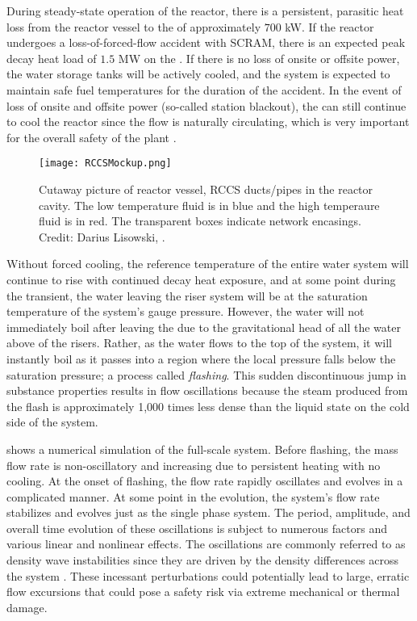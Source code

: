 During steady-state operation of the reactor, there is a persistent, parasitic heat loss from the reactor vessel to the  of approximately $700$ kW.
If the reactor undergoes a loss-of-forced-flow accident with SCRAM, there is an expected peak decay heat load of $1.5$ MW on the .
If there is no loss of onsite or offsite power, the  water storage tanks will be actively cooled, and the system is expected to maintain safe fuel temperatures for the duration of the accident.
In the event of loss of onsite and offsite power (so-called station blackout), the  can still continue to cool the reactor since the flow is naturally circulating, which is very important for the overall safety of the plant \cite[]{nuclearregulatorycomminission_us_2007}.

\begin{figure}%
\centering
    \caption[RCCS near-reactor-riser system]{   Cutaway picture of reactor vessel, RCCS ducts/pipes in the reactor cavity.  
                The low temperature fluid is in blue and the high temperaure fluid is in red.  
                The transparent boxes indicate network encasings. 
                Credit: Darius Lisowski, \TheUniversity.}%
    \label{Figure:RCCSMockup}%
    \texttt{[image: RCCSMockup.png]}%
\end{figure}

Without forced cooling, the reference temperature of the entire water system will continue to rise with continued decay heat exposure, and at some point during the transient, the water leaving the riser system will be at the saturation temperature of the system's gauge pressure.
However, the water will not immediately boil after leaving the due to the gravitational head of all the water above of the risers.
Rather, as the water flows to the top of the system, it will instantly boil as it passes into a region where the local pressure falls below the saturation pressure; a process called \textit{flashing}.
This sudden discontinuous jump in substance properties results in flow oscillations because the steam produced from the flash is approximately 1,000 times less dense than the liquid state on the cold side of the system.

 shows a numerical simulation of the full-scale system.
Before flashing, the mass flow rate is non-oscillatory and increasing due to persistent heating with no cooling.
At the onset of flashing, the flow rate rapidly oscillates and evolves in a complicated manner.
At some point in the evolution, the system's flow rate stabilizes and evolves just as the single phase system.
The period, amplitude, and overall time evolution of these oscillations is subject to numerous factors and various linear and nonlinear effects.
The oscillations are commonly referred to as density wave instabilities since they are driven by the density differences across the system \cite{achard_analysis_1985}.
These incessant perturbations could potentially lead to large, erratic flow excursions that could pose a safety risk via extreme mechanical or thermal damage.

